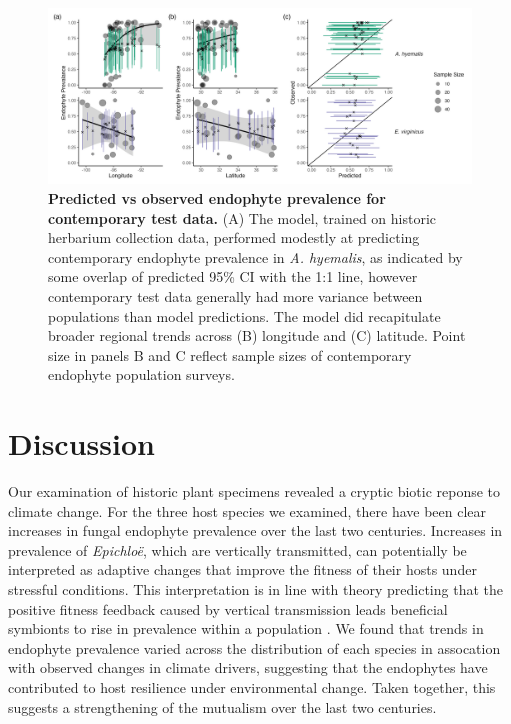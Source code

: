 \documentclass[11pt]{article}
\let\cite\citep
\begin{document}
\begin{figure}[H]
	\centering
	\includegraphics[width = \linewidth]{../Plots/contemp_test_plot.png}
	\caption{\textbf{Predicted vs observed endophyte prevalence for contemporary test data.} (A) The model, trained on historic herbarium collection data, performed modestly at predicting contemporary endophyte prevalence in \emph{A. hyemalis}, as indicated by some overlap of predicted 95\% CI with the 1:1 line, however contemporary test data generally had more variance between populations than model predictions. The model did recapitulate broader regional trends across (B) longitude and (C) latitude. Point size in panels B and C reflect sample sizes of contemporary endophyte population surveys.}
	\label{fig:contemptestplot}
\end{figure}

\section*{Discussion}
Our examination of historic plant specimens revealed a cryptic biotic reponse to climate change. 
For the three host species we examined, there have been clear increases in fungal endophyte prevalence over the last two centuries.
Increases in prevalence of \emph{Epichloë}, which are vertically transmitted, can potentially be interpreted as adaptive changes that improve the fitness of their hosts under stressful conditions.
This interpretation is in line with theory predicting that the positive fitness feedback caused by vertical transmission leads beneficial symbionts to rise in prevalence within a population \cite{fine1975vectors}.
We found that trends in endophyte prevalence varied across the distribution of each species in assocation with observed changes in climate drivers, suggesting that the endophytes have contributed to host resilience under environmental change.
Taken together, this suggests a strengthening of the mutualism over the last two centuries.
\end{document}
